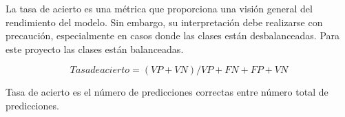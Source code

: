 \begin{enumerate}
La tasa de acierto es una métrica que proporciona una visión general del rendimiento del modelo. Sin embargo, su interpretación debe realizarse con precaución, especialmente en casos donde las clases están desbalanceadas. Para este proyecto las clases están balanceadas.



	\begin{equation*}
	Tasa de acierto = (VP + VN) / VP + FN + FP + VN
	\end{equation*}
	
	Tasa de acierto es el número de predicciones correctas entre número total de predicciones.



\end{enumerate}
